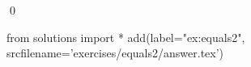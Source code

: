 
\begin{ex} 
  \label{ex:equals2}
  
  \qed
\end{ex} 
\begin{python0}
from solutions import *
add(label="ex:equals2",
    srcfilename='exercises/equals2/answer.tex') 
\end{python0}
